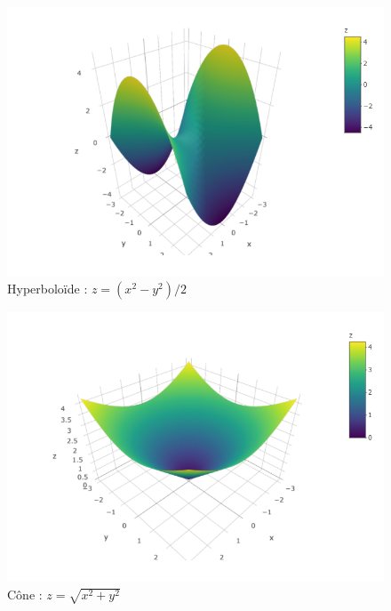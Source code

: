 \documentclass[]{book}
\theoremstyle{definition}
\theoremstyle{definition}
\theoremstyle{definition}
\theoremstyle{remark}
\begin{document}
\begin{figure}

{\centering \includegraphics[width=0.8\linewidth]{resources/images/hyperboloide} 

}

\caption{Hyperboloïde : $z=(x^2-y^2)/2$}\label{fig:hyperboloide}
\end{figure}

\begin{figure}

{\centering \includegraphics[width=0.8\linewidth]{resources/images/cone} 

}

\caption{Cône : $z=\sqrt{x^2+y^2}$}\label{fig:cone}
\end{figure}
\end{document}
